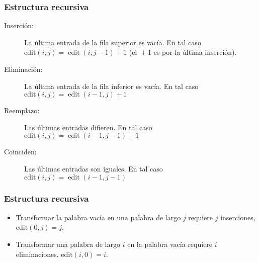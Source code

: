 \documentclass[english, spanish, fleqn,%
hyperref = {colorlinks, urlcolor = blue}%
]{beamer}
\begin{document}
\begin{frame}
  \setcounter{beamerpauses}{2}
  \frametitle{Estructura recursiva}

  \begin{description}
  \item[Inserción:]
    La última entrada de la fila superior es vacía.
    En tal caso
    \(\mathrm{edit}(i, j) = \operatorname{edit}(i, j - 1) + 1\)
    (el \({}+ 1\) es por la última inserción).
  \item[Eliminación:]
    La última entrada de la fila inferior es vacía.
    En tal caso
    \(\mathrm{edit}(i, j) = \operatorname{edit}(i - 1, j) + 1\)
  \item[Reemplazo:]
    Las últimas entradas difieren.
    En tal caso
    \(\mathrm{edit}(i, j) = \operatorname{edit}(i - 1, j - 1) + 1\)
  \item[Coinciden:]
    Las últimas entradas son iguales.
    En tal caso
    \(\mathrm{edit}(i, j) = \operatorname{edit}(i - 1, j - 1)\)
  \end{description}
\end{frame}

\begin{frame}
  \setcounter{beamerpauses}{2}
  \frametitle{Estructura recursiva}

  \begin{itemize}
  \item
    Transformar la palabra vacía en una palabra de largo \(j\)
    requiere \(j\) inserciones,
    \(\mathrm{edit}(0, j) = j\).
  \item
    Transformar una palabra de largo \(i\) en la palabra vacía
    requiere \(i\) eliminaciones,
    \(\mathrm{edit}(i, 0) = i\).
  \end{itemize}
\end{frame}
\end{document}
